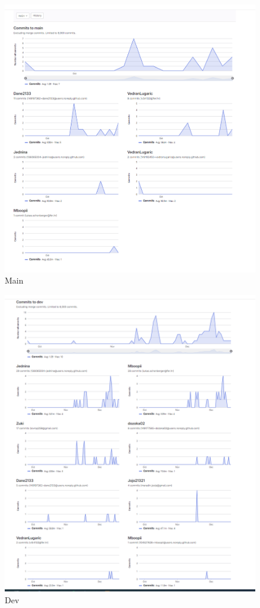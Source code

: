 		
		\begin{figure}
			\centering
			\includegraphics[width=15cm]{slike/main.png}
			\caption{Main}
			\label{fig:akt}
		\end{figure}
		\begin{figure}
			\centering
			\includegraphics[width=15cm]{slike/dev.png}
			\caption{Dev}
			\label{fig:akt}
		\end{figure}
